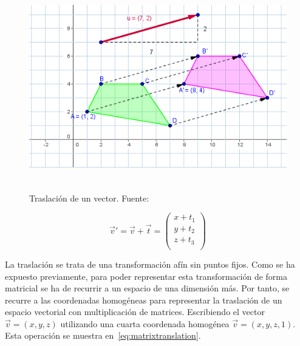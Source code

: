 \begin{figure}
	\centering	
	\includegraphics[height=9cm]{figures/traslacion.png}
	\caption[Traslación de un vector.]{Traslación de un vector.
	Fuente:~\cite{vectortraslationimage}}
	\label{fig:traslation}
\end{figure}

\begin{equation}
	\label{eq:translation}
	\overrightarrow{v}' = \overrightarrow{v} + \overrightarrow{t} = 
	\left( \begin{array}{c}
			x + t_1 \\
			y + t_2 \\
			z + t_3 \\
	\end{array} \right)
\end{equation}

La traslación se trata de una transformación afín sin puntos fijos. Como se ha
expuesto previamente, para poder representar esta transformación de forma
matricial se ha de recurrir a un espacio de una dimensión más. Por tanto, se
recurre a las coordenadas homogéneas para representar la traslación de un
espacio vectorial con multiplicación de matrices. Escribiendo el vector
$\overrightarrow{v} = (x,y,z)$ utilizando una cuarta coordenada homogénea
$\overrightarrow{v} = (x,y,z,1)$. Esta operación se muestra
en~\eqref{eq:matrixtranslation}. 

